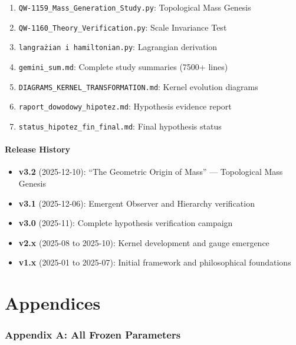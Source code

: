 \documentclass[11pt, a4paper]{article}
\theoremstyle{remark}
\begin{document}
\begin{enumerate}
    \item \texttt{QW-1159\_Mass\_Generation\_Study.py}: Topological Mass Genesis
    \item \texttt{QW-1160\_Theory\_Verification.py}: Scale Invariance Test
    \item \texttt{langrażian i hamiltonian.py}: Lagrangian derivation
    \item \texttt{gemini\_sum.md}: Complete study summaries (7500+ lines)
    \item \texttt{DIAGRAMS\_KERNEL\_TRANSFORMATION.md}: Kernel evolution diagrams
    \item \texttt{raport\_dowodowy\_hipotez.md}: Hypothesis evidence report
    \item \texttt{status\_hipotez\_fin\_final.md}: Final hypothesis status
\end{enumerate}

\subsection{Release History}

\begin{itemize}
    \item \textbf{v3.2} (2025-12-10): ``The Geometric Origin of Mass'' --- Topological Mass Genesis
    \item \textbf{v3.1} (2025-12-06): Emergent Observer and Hierarchy verification
    \item \textbf{v3.0} (2025-11): Complete hypothesis verification campaign
    \item \textbf{v2.x} (2025-08 to 2025-10): Kernel development and gauge emergence
    \item \textbf{v1.x} (2025-01 to 2025-07): Initial framework and philosophical foundations
\end{itemize}

\appendix
\part*{Appendices}

\section{Appendix A: All Frozen Parameters}
\end{document}
